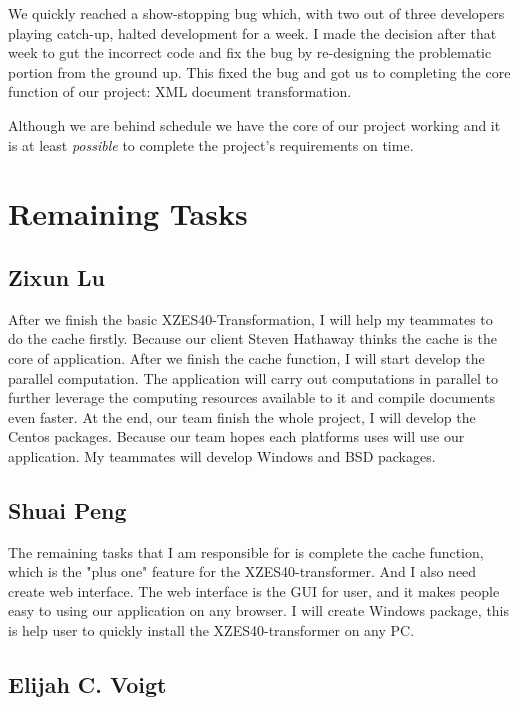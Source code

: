 We quickly reached a show-stopping bug which, with two out of three developers playing catch-up, halted development for a week.
I made the decision after that week to gut the incorrect code and fix the bug by re-designing the problematic portion from the ground up.
This fixed the bug and got us to completing the core function of our project: XML document transformation.

Although we are behind schedule we have the core of our project working and it is at least \textit{possible} to complete the project's requirements on time.

\section{Remaining Tasks}

\subsection{Zixun Lu}

After we finish the basic XZES40-Transformation, I will help my teammates to do the cache firstly. 
Because our client Steven Hathaway thinks the cache is the core of application. 
After we finish the cache function, I will start develop the parallel computation. 
The application will carry out computations in parallel to further leverage the computing resources available to it and compile documents even faster. 
At the end, our team finish the whole project, I will develop the Centos packages.
Because our team hopes each platforms uses will use our application.
My teammates will develop Windows and BSD packages.

\subsection{Shuai Peng}

The remaining tasks that I am responsible for is complete the cache function, which is the "plus one" feature for the XZES40-transformer. 
And I also need create web interface. 
The web interface is the GUI for user, and it makes people easy to using our application on any browser.
I will create Windows package, this is help user to quickly install the XZES40-transformer on any PC.


\subsection{Elijah C. Voigt}

